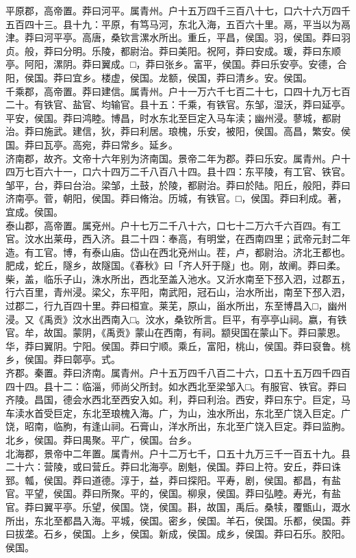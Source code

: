 \documentclass[]{article}
\begin{document}
平原郡，高帝置。莽曰河平。属青州。户十五万四千三百八十七，口六十六万四千五百四十三。县十九：平原，有笃马河，东北入海，五百六十里。鬲，平当以为鬲津。莽曰河平亭。高唐，桑钦言漯水所出。重丘，平昌，侯国。羽，侯国。莽曰羽贞。般，莽曰分明。乐陵，都尉治。莽曰美阳。祝阿，莽曰安成。瑗，莽曰东顺亭。阿阳，漯阴。莽曰翼成。□，莽曰张乡。富平，侯国。莽曰乐安亭。安德，合阳，侯国。莽曰宜乡。楼虚，侯国。龙额，侯国，莽曰清乡。安。侯国。\\
千乘郡，高帝置。莽曰建信。属青州。户十一万六千七百二十七，口四十九万七百二十。有铁官、盐官、均输官。县十五：千乘，有铁官。东邹，湿沃，莽曰延亭。平安，侯国。莽曰鸿睦。博昌，时水东北至巨定入马车渎；幽州浸。蓼城，都尉治。莽曰施武。建信，狄，莽曰利居。琅槐，乐安，被阳，侯国。高昌，繁安。侯国。莽曰瓦亭。高宛，莽曰常乡。延乡。\\
济南郡，故齐。文帝十六年别为济南国。景帝二年为郡。莽曰乐安。属青州。户十四万七百六十一，口六十四万二千八百八十四。县十四：东平陵，有工官、铁官。邹平，台，莽曰台治。梁邹，土鼓，於陵，都尉治。莽曰於陆。阳丘，般阳，莽曰济南亭。菅，朝阳，侯国。莽曰脩治。历城，有铁官。□，侯国。莽曰利成。著，宜成。侯国。\\
泰山郡，高帝置。属兗州。户十七万二千八十六，口七十二万六千六百四。有工官。汶水出莱毋，西入济。县二十四：奉高，有明堂，在西南四里；武帝元封二年造。有工官。博，有泰山庙。岱山在西北兗州山。茬，卢，都尉治。济北王都也。肥成，蛇丘，隧乡，故隧国。《春秋》曰「齐人歼于隧」也。刚，故阐。莽曰柔。柴，盖，临乐子山，洙水所出，西北至盖入池水。又沂水南至下邳入泗，过郡五，行六百里，青州浸。梁父，东平阳，南武阳，冠石山，治水所出，南至下邳入泗，过郡二，行九百四十里。莽曰桓宣。莱芜，原山，甾水所出，东至博昌入□，幽州浸。又《禹贡》汶水出西南入□。汶水，桑钦所言。巨平，有亭亭山祠。嬴，有铁官。牟，故国。蒙阴，《禹贡》蒙山在西南，有祠。颛臾国在蒙山下。莽曰蒙恩。华，莽曰翼阴。宁阳。侯国。莽曰宁顺。乘丘，富阳，桃山，侯国。莽曰裒鲁。桃乡，侯国。莽曰鄣亭。式。\\
齐郡。秦置。莽曰济南。属青州。户十五万四千八百二十六，口五十五万四千四百四十四。县十二：临淄，师尚父所封。如水西北至梁邹入□。有服官、铁官。莽曰齐陵。昌国，德会水西北至西安入如。利，莽曰利治。西安，莽曰东宁。巨定，马车渎水首受巨定，东北至琅槐入海。广，为山，浊水所出，东北至广饶入巨定。广饶，昭南，临朐，有逢山祠。石膏山，洋水所出，东北至广饶入巨定。莽曰监朐。北乡，侯国。莽曰禺聚。平广，侯国。台乡。\\
北海郡，景帝中二年置。属青州。户十二万七千，口五十九万三千一百五十九。县二十六：营陵，或曰营丘。莽曰北海亭。剧魁，侯国。莽曰上符。安丘，莽曰诛郅。瓡，侯国。莽曰道德。淳于，益，莽曰探阳。平寿，剧，侯国。都昌，有盐官。平望，侯国。莽曰所聚。平的，侯国。柳泉，侯国。莽曰弘睦。寿光，有盐官。莽曰翼平亭。乐望，侯国。饶，侯国。斟，故国，禹后。桑犊，覆甑山，溉水所出，东北至都昌入海。平城，侯国。密乡，侯国。羊石，侯国。乐都，侯国。莽曰拔垄。石乡，侯国。上乡，侯国。新成，侯国。成乡，侯国。莽曰石乐。胶阳。侯国。\\
\end{document}
